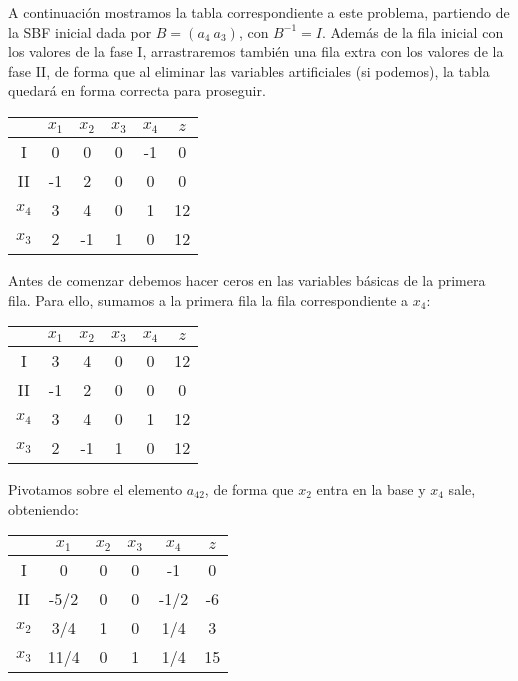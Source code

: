 \documentclass[11pt,a4paper]{article}
\begin{document}
\newpage
A continuación mostramos la tabla correspondiente a este problema, partiendo de la SBF inicial dada por $B=(a_4 \ a_3)$, con $B^{-1}=I$. Además de la fila inicial con los valores de la fase I, arrastraremos también una fila extra con los valores de la fase II, de forma que al eliminar las variables artificiales (si podemos), la tabla quedará en forma correcta para proseguir.
\begin{table}[h!]
  \centering
  \begin{tabular}{c|cccc|c}
    & $x_1$ & $x_2$ & $x_3$ & $x_4$ & $z$\\
    \hline
    I & 0 & 0 & 0 & -1 & 0\\
    \hline
    II & -1 & 2 & 0 & 0 & 0\\
    \hline
    $x_4$ & 3 & 4 & 0 & 1 & 12\\
    $x_3$ & 2 & -1 & 1 & 0 & 12
  \end{tabular}
\end{table}

Antes de comenzar debemos hacer ceros en las variables básicas de la primera fila. Para ello, sumamos a la primera fila la fila correspondiente a $x_4$:
\begin{table}[h!]
  \centering
  \begin{tabular}{c|cccc|c}
    & $x_1$ & $x_2$ & $x_3$ & $x_4$ & $z$\\
    \hline
    I & 3 & 4 & 0 & 0 & 12\\
    \hline
    II & -1 & 2 & 0 & 0 & 0\\
    \hline
    $x_4$ & 3 & {\color{red}4} & 0 & 1 & 12\\
    $x_3$ & 2 & -1 & 1 & 0 & 12
  \end{tabular}
\end{table}

Pivotamos sobre el elemento $a_{42}$, de forma que $x_2$ entra en la base y $x_4$ sale, obteniendo:

\begin{table}[h!]
  \centering
  \begin{tabular}{c|cccc|c}
    & $x_1$ & $x_2$ & $x_3$ & $x_4$ & $z$\\
    \hline
    I & 0 & 0 & 0 & -1 & 0\\
    \hline
    II & -5/2 & 0 & 0 & -1/2 & -6\\
    \hline
    $x_2$ & 3/4 & 1 & 0 & 1/4 & 3\\
    $x_3$ & 11/4 & 0 & 1 & 1/4 & 15
  \end{tabular}
\end{table}
\end{document}
